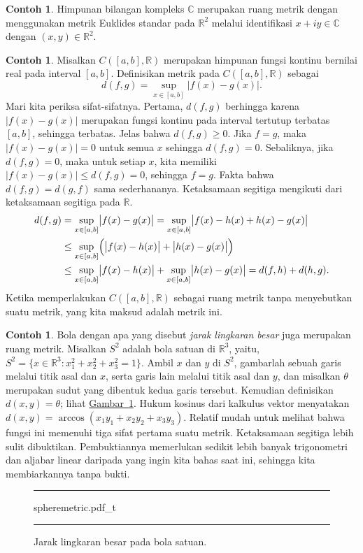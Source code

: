 \documentclass[12pt,openany]{book}
\newcommand{\babs}[1]{\bigl\lvert {#1} \bigr\rvert}
\newcommand{\abs}[1]{\left\lvert {#1} \right\rvert}
\newcommand{\C}{{\mathbb{C}}}
\newcommand{\R}{{\mathbb{R}}}
\newcommand{\myindex}[1]{#1\index{#1}}
\theoremstyle{plain}
\theoremstyle{remark}
\theoremstyle{definition}
\newenvironment{myfig}{%
\begin{figure}[h!t]
\noindent\rule{\textwidth}{0.5pt}\vspace{12pt}\par\centering}%
{\par\noindent\rule{\textwidth}{0.5pt}
\end{figure}}
\theoremstyle{exercise}
\theoremstyle{example}
\newtheorem{example}[thm]{Contoh}
\newcommand{\figureref}[1]{\hyperref[#1]{Gambar~\ref*{#1}}}
\begin{document}
\begin{example} \label{example:mscomplex}
Himpunan bilangan kompleks $\C$ merupakan ruang metrik dengan menggunakan metrik
Euklides standar pada $\R^2$
melalui identifikasi $x+iy \in \C$ dengan $(x,y) \in \R^2$.
\end{example}

\begin{example} \label{example:msC01}
Misalkan $C([a,b],\R)$ merupakan himpunan fungsi kontinu bernilai real pada
interval $[a,b]$.  Definisikan metrik pada $C([a,b],\R)$ sebagai
\begin{equation*}
d(f,g) = \sup_{x \in [a,b]} \abs{f(x)-g(x)} .
\end{equation*}
Mari kita periksa sifat-sifatnya.  Pertama, $d(f,g)$ berhingga karena
$\babs{f(x)-g(x)}$ merupakan fungsi kontinu pada interval tertutup terbatas
$[a,b]$, sehingga terbatas.
Jelas bahwa $d(f,g) \geq 0$. 
Jika $f = g$,
maka $\abs{f(x)-g(x)} = 0$ untuk semua $x$ sehingga $d(f,g) = 0$.  Sebaliknya,
jika $d(f,g) = 0$, maka untuk setiap $x$, kita memiliki $\abs{f(x)-g(x)} \leq d(f,g) = 0$,
sehingga $f=g$.  Fakta bahwa $d(f,g) = d(g,f)$
sama sederhananya.  Ketaksamaan segitiga mengikuti dari 
ketaksamaan segitiga pada $\R$.
\begin{equation*}
\begin{split}
d(f,g) & =
\sup_{x \in [a,b]} \babs{f(x)-g(x)} =
\sup_{x \in [a,b]} \babs{f(x)-h(x)+h(x)-g(x)}
\\
& \leq
\sup_{x \in [a,b]} \Bigl( \babs{f(x)-h(x)}+\babs{h(x)-g(x)} \Bigr)
\\
& \leq
\sup_{x \in [a,b]} \babs{f(x)-h(x)}+
\sup_{x \in [a,b]} \babs{h(x)-g(x)} = d(f,h) + d(h,g) .
\end{split}
\end{equation*}
Ketika memperlakukan $C([a,b],\R)$ sebagai ruang metrik tanpa menyebutkan suatu metrik, yang kita maksud adalah
metrik ini.
\end{example}

\begin{example} \label{ms:greatcircle}
Bola dengan apa yang disebut
\emph{\myindex{jarak lingkaran besar}} juga merupakan ruang metrik.
Misalkan $S^2$ adalah \myindex{bola satuan} di $\R^3$,
yaitu, $S^2 = \bigl\{ x \in \R^3 : x_1^2+x_2^2+x_3^2 = 1 \bigr\}$.
Ambil $x$ dan $y$ di $S^2$, gambarlah sebuah garis melalui titik asal dan $x$,
serta garis lain melalui titik asal dan $y$,
dan misalkan $\theta$ merupakan sudut yang dibentuk kedua garis tersebut.
Kemudian definisikan $d(x,y) = \theta$; lihat \figureref{fig:spheremetric}.
Hukum kosinus dari kalkulus vektor menyatakan
$d(x,y) = \arccos(x_1y_1+x_2y_2+x_3y_3)$.
Relatif mudah untuk melihat bahwa fungsi ini memenuhi tiga sifat pertama
suatu metrik.
Ketaksamaan segitiga lebih sulit dibuktikan.  Pembuktiannya memerlukan sedikit lebih banyak
trigonometri dan aljabar linear daripada yang ingin kita bahas saat ini,
sehingga kita membiarkannya tanpa bukti.
\begin{myfig}
{spheremetric.pdf_t}
\caption{Jarak lingkaran besar pada bola satuan.\label{fig:spheremetric}}
\end{myfig}
\end{example}
\end{document}

